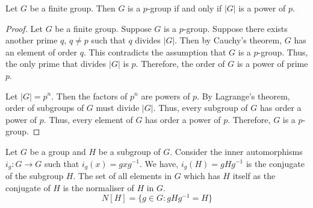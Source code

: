 \begin{corollary}
	Let $G$ be a finite group. Then $G$ is a $p$-group if and only if $|G|$ is a power of $p$.
\end{corollary}
\begin{proof}
	Let $G$ be a finite group.
	Suppose $G$ is a $p$-group.
	Suppose there exists another prime $q$, $q \ne p$ such that $q$ divides $|G|$.
	Then by Cauchy's theorem, $G$ has an element of order $q$.
	This contradicts the assumption that $G$ is a $p$-group.
	Thus, the only prime that divides $|G|$ is $p$.
	Therefore, the order of $G$ is a power of prime $p$.

	Let $|G|=p^n$.
	Then the factors of $p^n$ are powers of $p$.
	By Lagrange's theorem, order of subgroups of $G$ must divide $|G|$.
	Thus, every subgroup of $G$ has order a power of $p$.
	Thus, every element of $G$ has order a power of $p$.
	Therefore, $G$ is a $p$-group.
\end{proof}

\begin{definition}
	Let $G$ be a group and $H$ be a subgroup of $G$.
	Consider the inner automorphisms $i_g : G \to G$ such that $i_g(x) = gxg^{-1}$.
	We have, $i_g(H) = gHg^{-1}$ is the conjugate of the subgroup $H$.
	The set of all elements in $G$ which has $H$ itself as the conjugate of $H$ is the normaliser of $H$ in $G$.
	\begin{equation}
		N[H] = \{ g \in G : gHg^{-1} = H\}
	\end{equation}
\end{definition}

